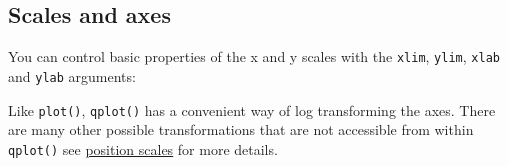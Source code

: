 \subsection{Scales and axes}

You can control basic properties of the x and y scales with the
\texttt{xlim}, \texttt{ylim}, \texttt{xlab} and \texttt{ylab} arguments:

\begin{Shaded}
\begin{Highlighting}[]
  \NormalTok{(}\NormalTok{, }\NormalTok{), } \NormalTok{)}
\StringTok{ }\NormalTok{() +}\StringTok{ }
\StringTok{  }\NormalTok{(}\NormalTok{, } \NormalTok{(}\NormalTok{, }\NormalTok{))}

  \NormalTok{(}\NormalTok{, }\NormalTok{), } \NormalTok{(}\NormalTok{, }\NormalTok{))}
\StringTok{ }\NormalTok{() +}\StringTok{ }
\StringTok{  }\NormalTok{(} \NormalTok{(}\NormalTok{, }\NormalTok{))}
  \NormalTok{(} \NormalTok{(}\NormalTok{, }\NormalTok{))}
\end{Highlighting}
\end{Shaded}

Like \texttt{plot()}, \texttt{qplot()} has a convenient way of log
transforming the axes. There are many other possible transformations
that are not accessible from within \texttt{qplot()} see
\hyperref[sub:scale-position]{position scales} for more details.

\begin{Shaded}
\begin{Highlighting}[]
 \NormalTok{)}
\StringTok{ }\NormalTok{() +}\StringTok{ }
\StringTok{  }\NormalTok{() +}\StringTok{ }\NormalTok{()}
\end{Highlighting}
\end{Shaded}

